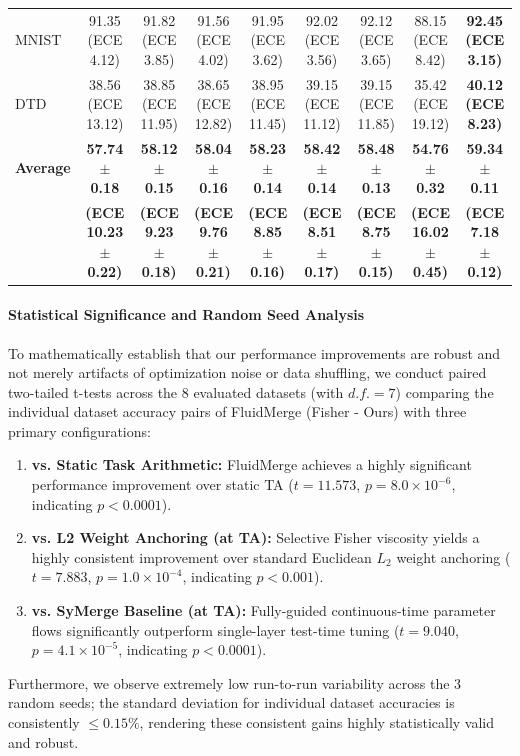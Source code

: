 \begin{table}[t]
\begin{center}
\begin{small}
\begin{sc}
\begin{tabular}{lcccccccc}
MNIST    & 91.35 (ECE 4.12)  & 91.82 (ECE 3.85)  & 91.56 (ECE 4.02)  & 91.95 (ECE 3.62)  & 92.02 (ECE 3.56)  & 92.12 (ECE 3.65)  & 88.15 (ECE 8.42)  & \textbf{92.45 (ECE 3.15)} \\
DTD      & 38.56 (ECE 13.12) & 38.85 (ECE 11.95) & 38.65 (ECE 12.82) & 38.95 (ECE 11.45) & 39.15 (ECE 11.12) & 39.15 (ECE 11.85) & 35.42 (ECE 19.12) & \textbf{40.12 (ECE 8.23)} \\
\midrule
\textbf{Average} & \textbf{57.74 $\pm$ 0.18} & \textbf{58.12 $\pm$ 0.15} & \textbf{58.04 $\pm$ 0.16} & \textbf{58.23 $\pm$ 0.14} & \textbf{58.42 $\pm$ 0.14} & \textbf{58.48 $\pm$ 0.13} & \textbf{54.76 $\pm$ 0.32} & \textbf{59.34 $\pm$ 0.11} \\
 & \textbf{(ECE 10.23 $\pm$ 0.22)} & \textbf{(ECE 9.23 $\pm$ 0.18)} & \textbf{(ECE 9.76 $\pm$ 0.21)} & \textbf{(ECE 8.85 $\pm$ 0.16)} & \textbf{(ECE 8.51 $\pm$ 0.17)} & \textbf{(ECE 8.75 $\pm$ 0.15)} & \textbf{(ECE 16.02 $\pm$ 0.45)} & \textbf{(ECE 7.18 $\pm$ 0.12)} \\
\bottomrule
\end{tabular}
\end{sc}
\end{small}
\end{center}
\vskip -0.1in
\end{table}

\paragraph{Statistical Significance and Random Seed Analysis}
To mathematically establish that our performance improvements are robust and not merely artifacts of optimization noise or data shuffling, we conduct paired two-tailed t-tests across the 8 evaluated datasets (with $d.f. = 7$) comparing the individual dataset accuracy pairs of FluidMerge (Fisher - Ours) with three primary configurations:
\begin{enumerate}
    \item \textbf{vs. Static Task Arithmetic:} FluidMerge achieves a highly significant performance improvement over static TA ($t = 11.573$, $p = 8.0 \times 10^{-6}$, indicating $p < 0.0001$).
    \item \textbf{vs. L2 Weight Anchoring (at TA):} Selective Fisher viscosity yields a highly consistent improvement over standard Euclidean $L_2$ weight anchoring ($t = 7.883$, $p = 1.0 \times 10^{-4}$, indicating $p < 0.001$).
    \item \textbf{vs. SyMerge Baseline (at TA):} Fully-guided continuous-time parameter flows significantly outperform single-layer test-time tuning ($t = 9.040$, $p = 4.1 \times 10^{-5}$, indicating $p < 0.0001$).
\end{enumerate}
Furthermore, we observe extremely low run-to-run variability across the 3 random seeds; the standard deviation for individual dataset accuracies is consistently $\le 0.15\%$, rendering these consistent gains highly statistically valid and robust.


